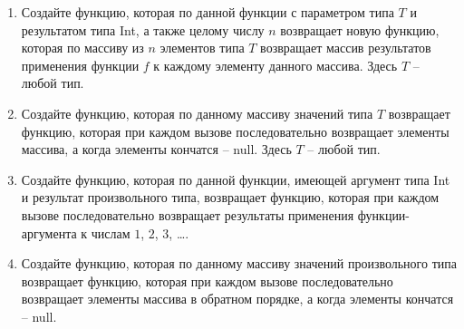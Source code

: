\begin{enumerate}
	\item Создайте функцию, которая по данной функции с параметром типа $T$ и результатом типа Int, а также целому числу $n$
		возвращает новую функцию, которая по массиву из $n$ элементов типа $T$ возвращает массив результатов применения функции $f$ 
		к каждому элементу данного массива. Здесь $T$ -- любой тип.

	\item Создайте функцию, которая по данному массиву значений типа $T$ возвращает функцию, которая при каждом вызове последовательно
		возвращает элементы массива, а когда элементы кончатся -- null. Здесь $T$ -- любой тип.

	\item Создайте функцию, которая по данной функции, имеющей аргумент типа Int и результат произвольного типа, возвращает функцию, 
		которая при каждом вызове последовательно возвращает результаты применения функции-аргумента к числам $1$, $2$, $3$, \dots.
	\item Создайте функцию, которая по данному массиву значений произвольного типа возвращает функцию, которая при каждом вызове последовательно
		возвращает элементы массива в обратном порядке, а когда элементы кончатся -- null.







	
\end{enumerate}

